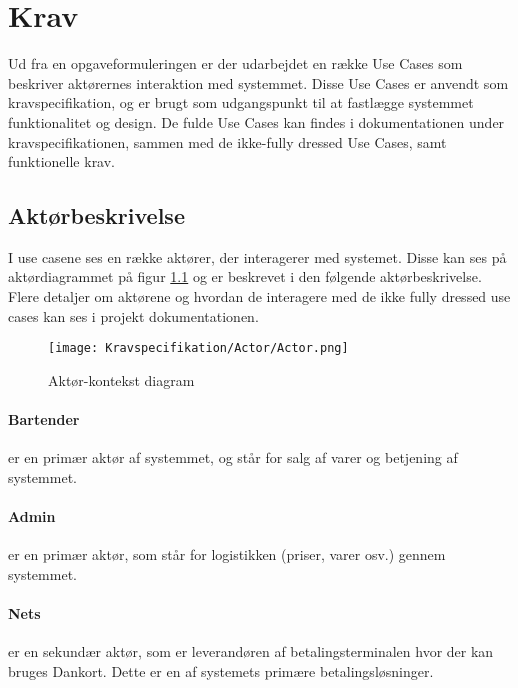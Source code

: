\chapter{Krav}
Ud fra en opgaveformuleringen er der udarbejdet en række Use Cases som beskriver aktørernes interaktion med systemmet. Disse Use Cases er anvendt som kravspecifikation, og er brugt som udgangspunkt til at fastlægge systemmet funktionalitet og design. De fulde Use Cases kan findes i dokumentationen under kravspecifikationen, sammen med de ikke-fully dressed Use Cases, samt funktionelle krav. \newline


\begin{minipage}{0.45\textwidth}
\raggedright
\section{Aktørbeskrivelse}
I use casene ses en række aktører, der interagerer med systemet. Disse kan ses på aktørdiagrammet på figur \ref{fig:actordiagram} og er beskrevet i den følgende aktørbeskrivelse. Flere detaljer om aktørene og hvordan de interagere med de ikke fully dressed use cases kan ses i projekt dokumentationen. 
\newline
\newline
\end{minipage}
\begin{minipage}{0.55\textwidth}
\begin{figure}[H]
	\centering
	\texttt{[image: Kravspecifikation/Actor/Actor.png]}
	\caption{Aktør-kontekst diagram}
	\label{fig:actordiagram}
\end{figure}
\end{minipage} \hfill
\newline
\subsubsection*{Bartender}
er en primær aktør af systemmet, og står for salg af varer og betjening af systemmet. 

\subsubsection*{Admin}
er en primær aktør, som står for logistikken (priser, varer osv.) gennem systemmet. 

\subsubsection*{Nets}
er en sekundær aktør, som er leverandøren af betalingsterminalen hvor der kan bruges Dankort. Dette er en af systemets primære betalingsløsninger.

